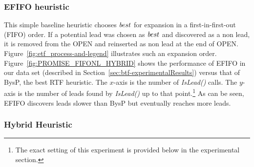 \documentclass[journal]{IEEEtran}
\newcommand{\islead}[1]{{\em IsLead(#1)}}
\newcommand{\best}{{\textit best}}
\begin{document}


\subsubsection{EFIFO heuristic}
This simple baseline heuristic chooses $\best$ for expansion in a first-in-first-out (FIFO) order. If a potential
lead was chosen as $\best$ and discovered as a non lead, it is removed from the OPEN and reinserted as non lead at the end of OPEN. 
Figure~\ref{fig:etf_process-and-legend} illustrates such an expansion order. Figure~\ref{fig:PROMISE_FIFONL_HYBRID} shows the performance of EFIFO in our data set (described in Section~\ref{sec:btf-experimentalResults}) versus that of BysP, the best RTF heuristic. The $x$-axis is the number of \islead{}
calls. The $y$-axis is the number of leads found by \islead{} up to that point.\footnote{The exact setting of this experiment is provided below in the experimental section.} As can be seen, EFIFO discovers leads slower than BysP but eventually reaches more leads.


\subsubsection{Hybrid Heuristic}
\end{document}
